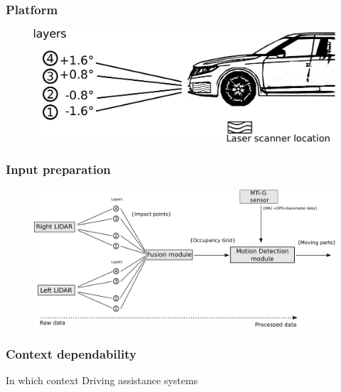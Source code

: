 \documentclass{beamer}
\begin{document}
\begin{frame}
	\end{frame}

	\begin{frame}
		\frametitle{Platform}
		\begin{figure}[h]
			\center
			\includegraphics[scale=0.4]{../img/fig:demonstrator:lateral}
		\end{figure}
	\end{frame}

	\begin{frame}
		\frametitle{Input preparation}
		\begin{figure}[h]
			\center
			\includegraphics[scale=0.18]{../img/fig:motion:framework}
		\end{figure}
	
	\end{frame}

	\begin{frame}
		\frametitle{Context dependability}
		 
		\begin{block}{In which context}
			Driving assistance systems
		\end{block}
		 
	\end{frame}	
\end{document}
